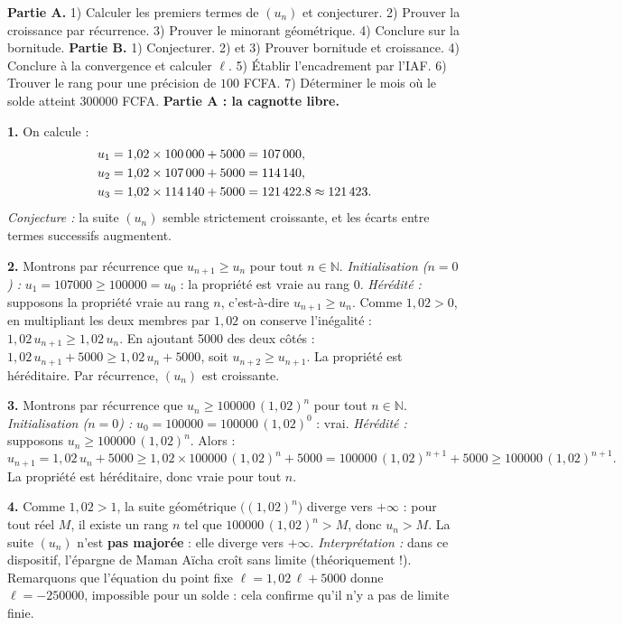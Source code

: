 \documentclass[11pt]{article}
\newcommand{\cle}[1]{{\popxbold\color{popdark}#1}}
\begin{document}
\begin{exoresolu}
\textbf{Partie A.} 1) Calculer les premiers termes de $(u_n)$ et conjecturer. 2) Prouver la croissance par récurrence. 3) Prouver le minorant géométrique. 4) Conclure sur la bornitude. \textbf{Partie B.} 1) Conjecturer. 2) et 3) Prouver bornitude et croissance. 4) Conclure à la convergence et calculer $\ell$. 5) Établir l'encadrement par l'IAF. 6) Trouver le rang pour une précision de $100$ FCFA. 7) Déterminer le mois où le solde atteint \num{300000} FCFA.
\tcblower
\textbf{Partie A : la cagnotte libre.}

\textbf{1.} On calcule :
\begin{align*}
u_1 &= 1{,}02\times \num{100000} + \num{5000} = \num{107000},\\
u_2 &= 1{,}02\times \num{107000} + \num{5000} = \num{114140},\\
u_3 &= 1{,}02\times \num{114140} + \num{5000} = \num{121422{,}8} \approx \num{121423}.
\end{align*}
\emph{Conjecture :} la suite $(u_n)$ semble strictement croissante, et les écarts entre termes successifs augmentent.

\textbf{2.} Montrons par récurrence que $u_{n+1}\geq u_n$ pour tout $n\in\mathbb{N}$.
\emph{Initialisation ($n=0$) :} $u_1 = \num{107000} \geq \num{100000} = u_0$ : la propriété est vraie au rang $0$.
\emph{Hérédité :} supposons la propriété vraie au rang $n$, c'est-à-dire $u_{n+1}\geq u_n$.
Comme $1{,}02>0$, en multipliant les deux membres par $1{,}02$ on conserve l'inégalité :
$1{,}02\,u_{n+1} \geq 1{,}02\,u_n$.
En ajoutant \num{5000} des deux côtés :
$1{,}02\,u_{n+1} + \num{5000} \geq 1{,}02\,u_n + \num{5000}$, soit $u_{n+2} \geq u_{n+1}$.
La propriété est héréditaire. Par récurrence, $(u_n)$ est \cle{croissante}.

\textbf{3.} Montrons par récurrence que $u_n \geq \num{100000}\,(1{,}02)^n$ pour tout $n\in\mathbb{N}$.
\emph{Initialisation ($n=0$) :} $u_0 = \num{100000} = \num{100000}\,(1{,}02)^0$ : vrai.
\emph{Hérédité :} supposons $u_n \geq \num{100000}\,(1{,}02)^n$.
Alors :
\[ u_{n+1} = 1{,}02\,u_n + \num{5000} \geq 1{,}02\times \num{100000}\,(1{,}02)^n + \num{5000} = \num{100000}\,(1{,}02)^{n+1} + \num{5000} \geq \num{100000}\,(1{,}02)^{n+1}. \]
La propriété est héréditaire, donc vraie pour tout $n$.

\textbf{4.} Comme $1{,}02>1$, la suite géométrique $\bigl((1{,}02)^n\bigr)$ diverge vers $+\infty$ : pour tout réel $M$, il existe un rang $n$ tel que $\num{100000}\,(1{,}02)^n > M$, donc $u_n > M$.
La suite $(u_n)$ n'est \textbf{pas majorée} : elle diverge vers $+\infty$.
\emph{Interprétation :} dans ce dispositif, l'épargne de Maman Aïcha croît sans limite (théoriquement !). Remarquons que l'équation du point fixe $\ell = 1{,}02\,\ell + \num{5000}$ donne $\ell = -\num{250000}$, impossible pour un solde : cela confirme qu'il n'y a pas de limite finie.


\end{exoresolu}
\end{document}
